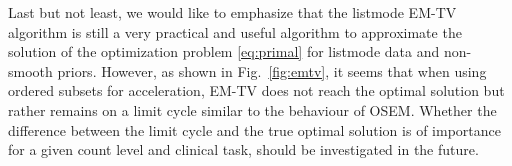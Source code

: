 Last but not least, we would like to emphasize that the listmode EM-TV algorithm
is still a very practical and useful algorithm to approximate the solution 
of the optimization problem \eqref{eq:primal} for listmode data and non-smooth priors.
However, as shown in Fig.~\ref{fig:emtv}, it seems that when using ordered subsets for acceleration,
EM-TV does not reach the optimal solution but rather remains on a limit cycle similar to the
behaviour of OSEM.
Whether the difference between the limit cycle and the true optimal solution is of importance
for a given count level and clinical task, should be investigated in the future.
